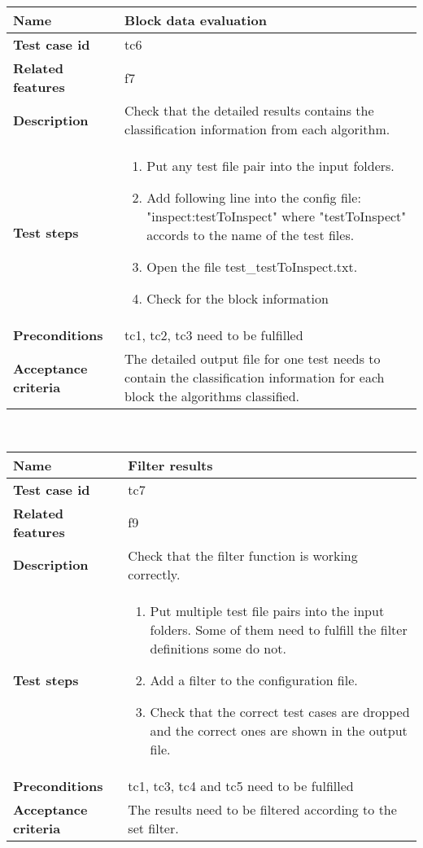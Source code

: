 	\begin{tabular}{ | p{3.5cm} | p{12cm} |}
	\hline
	\textbf{Name} 					& Block data evaluation 		\\ 	\hline
	\textbf{Test case id} 			& tc6						\\ 	\hline
	\textbf{Related features}		& f7						\\ 	\hline
	\textbf{Description} 			& Check that the detailed results contains the classification information from each algorithm.	\\ 	\hline
	\textbf{Test steps} 			& 	\begin{enumerate}
											\item{Put any test file pair into the input folders.}
											\item{Add following line into the config file: "inspect:testToInspect" where "testToInspect" accords to the name of the test files. }
											\item{Open the file test\_testToInspect.txt.}
											\item{Check for the block information}
										\end{enumerate}
																\\ 	\hline
	\textbf{Preconditions} 			& tc1, tc2, tc3 need to be fulfilled				\\ 	\hline
	\textbf{Acceptance criteria} 	& The detailed output file for one test needs to contain the classification information for each block the algorithms classified.	\\ 	\hline
	\end{tabular} \\

		\begin{tabular}{ | p{3.5cm} | p{12cm} |}
	\hline
	\textbf{Name} 					& Filter results 		\\ 	\hline
	\textbf{Test case id} 			& tc7						\\ 	\hline
	\textbf{Related features}		& f9						\\ 	\hline
	\textbf{Description} 			& Check that the filter function is working correctly.	\\ 	\hline
	\textbf{Test steps} 			& 	\begin{enumerate}
											\item{Put multiple test file pairs into the input folders. Some of them need to fulfill the filter definitions some do not.}
											\item{Add a filter to the configuration file.}
											\item{Check that the correct test cases are dropped and the correct ones are shown in the output file.}
										\end{enumerate}
																\\ 	\hline
	\textbf{Preconditions} 			& tc1, tc3, tc4 and tc5 need to be fulfilled				\\ 	\hline
	\textbf{Acceptance criteria} 	& The results need to be filtered according to the set filter.	\\ 	\hline
	\end{tabular} \\

